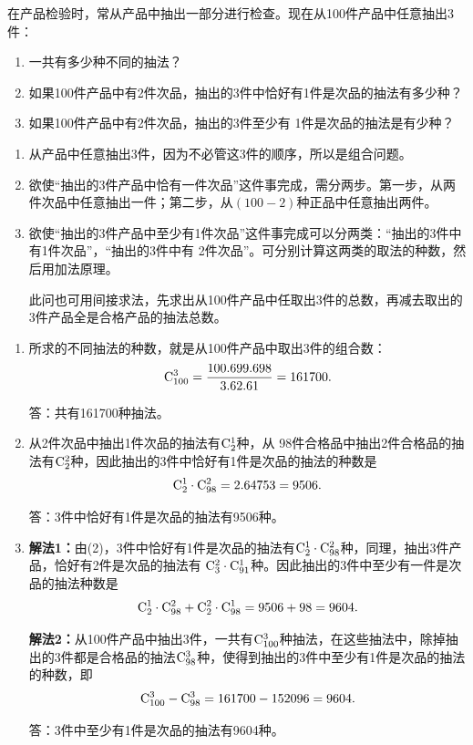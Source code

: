 \begin{example}
    在产品检验时，常从产品中抽出一部分进行检查。现在从100件产品中任意抽出3件：
\begin{enumerate}[(1)]
    \item 一共有多少种不同的抽法？
    \item 如果100件产品中有2件次品，抽出的3件中恰好有1件是次品的抽法有多少种？
    \item 如果100件产品中有2件次品，抽出的3件至少有 1件是次品的抽法是有少种？
\end{enumerate}
\end{example}

\begin{analyze}
\begin{enumerate}[(1)]
   \item 从产品中任意抽出3件，因为不必管这3件的顺序，所以是组合问题。
   \item 欲使“抽出的3件产品中恰有一件次品”这件事完成，需分两步。第一步，从两件次品中任意抽出一件；第二步，从$(100-2)$种正品中任意抽出两件。
\item 欲使“抽出的3件产品中至少有1件次品”这件事完成可以分两类：“抽出的3件中有1件次品”，“抽出的3件中有 2件次品”。可分别计算这两类的取法的种数，然后用加法原理。

此问也可用间接求法，先求出从100件产品中任取出3件的总数，再减去取出的3件产品全是合格产品的抽法总数。
\end{enumerate}
\end{analyze}

\begin{solution}
\begin{enumerate}[(1)]
    \item 所求的不同抽法的种数，就是从100件产品中取出3件的组合数：
\[
\comb{100}{3}=\frac{100\x  99\x  98}{3\x  2\x  1}=161700.
\]

答：共有161700种抽法。    
\item 从2件次品中抽出1件次品的抽法有$ \comb{2}{1} $种，从 98件合格品中抽出2件合格品的抽法有$ \comb{2}{2} $种，因此抽出的3件中恰好有1件是次品的抽法的种数是
\[
\comb{2}{1}\cdot  \comb{98}{2}=2\x  4753=9506.\]

答：3件中恰好有1件是次品的抽法有9506种。

\item \textbf{解法1：}由(2)，3件中恰好有1件是次品的抽法有$ \comb{2}{1}\cdot  \comb{98}{2} $种，同理，抽出3件产品，恰好有2件是次品的抽法有 $\comb{3}{2}\cdot  \comb{91}{1} $种。因此抽出的3件中至少有一件是次品的抽法种数是
\[
\comb{2}{1}\cdot  \comb{98}{2}+\comb{2}{2}\cdot  \comb{98}{1}=9506+98=9604.\]

\textbf{解法2：}从100件产品中抽出3件，一共有$ \comb{100}{3} $种抽法，在这些抽法中，除掉抽出的3件都是合格品的抽法$ \comb{98}{3} $种，使得到抽出的3件中至少有1件是次品的抽法的种数，即
\[
\comb{100}{3}-\comb{98}{3}=161700-152096=9604.\]

答：3件中至少有1件是次品的抽法有9604种。
\end{enumerate}
\end{solution}

